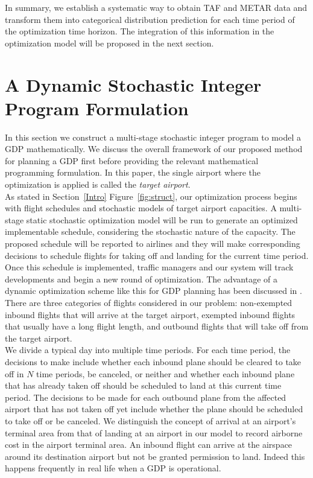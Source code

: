 \documentclass[12pt]{article}
\begin{document}
	\newline
	In summary, we establish a systematic way to obtain TAF and METAR data and transform them into categorical distribution prediction for each time period of the optimization time horizon. The integration of this information in the optimization model will be proposed in the next section.

\section{A Dynamic Stochastic Integer Program Formulation}\label{Model}
	In this section we construct a multi-stage stochastic integer program to model a GDP mathematically. We discuss the overall framework of our proposed method for planning a GDP first before providing the relevant mathematical programming formulation.  In this paper, the single airport where the optimization is applied is called the {\em target airport}.\\
	\newline As stated in Section~\ref{Intro} Figure~\ref{fig:struct}, our optimization process begins with flight schedules and stochastic models of target airport capacities. A multi-stage static stochastic optimization model will be run to generate an optimized implementable schedule, considering the stochastic nature of the capacity. The proposed schedule will be reported to airlines and they will make corresponding decisions to schedule flights for taking off and landing for the current time period. Once this schedule is implemented, traffic managers and our system will track developments and begin a new round of optimization. The advantage of a dynamic optimization scheme like this for GDP planning has been discussed in \cite{richetta1994dynamic}. \\
	\newline There are three categories of flights considered in our problem: non-exempted inbound flights that will arrive at the target airport, exempted inbound flights that usually have a long flight length, and outbound flights that will take off from the target airport. \\
	\newline
	We divide a typical day into multiple time periods. For each time period, the decisions to make include whether each inbound plane should be cleared to take off in \(N\) time periods, be canceled, or neither and whether each inbound plane that has already taken off should be scheduled to land at this current time period. The decisions to be made for each outbound plane from the affected airport that has not taken off yet include whether the plane should be scheduled to take off or be canceled. We distinguish the concept of arrival at an airport's terminal area from that of landing at an airport in our model to record airborne cost in the airport terminal area. An inbound flight can arrive at the airspace around its destination airport but not be granted permission to land.  Indeed this happens frequently in real life when a GDP is operational.
\end{document}

